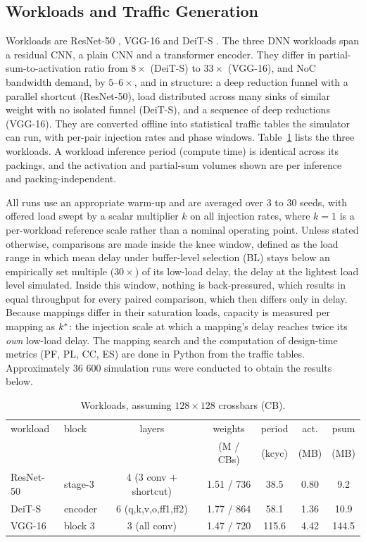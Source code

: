\subsection{Workloads and Traffic Generation}
\label{sec:workloads}
Workloads are ResNet-50 \cite{heDeepResidualLearning2016}, VGG-16 \cite{simonyanVeryDeepConvolutional2014} and DeiT-S \cite{touvronTrainingDataefficientImage2020}. The three DNN workloads span a residual CNN, a plain CNN and a transformer encoder. They differ in partial-sum-to-activation ratio from $8\times$ (DeiT-S) to $33\times$ (VGG-16), and NoC bandwidth demand, by $5$–$6\times$, and in structure: a deep reduction funnel with a parallel shortcut (ResNet-50), load distributed across many sinks of similar weight with no isolated funnel (DeiT-S), and a sequence of deep reductions (VGG-16). They are converted offline into statistical traffic tables the simulator can run, with per-pair injection rates and phase windows. Table~\ref{tab:workloads} lists the three workloads. A workload inference period (compute time) is identical across its packings, and the activation and partial-sum volumes shown are per inference and packing-independent. 

 All runs use an appropriate warm-up and are averaged over 3 to 30 seeds, with offered load swept by a scalar multiplier $k$ on all injection rates, where $k=1$ is a per-workload reference scale rather than a nominal operating point. Unless stated otherwise, comparisons are made inside the knee window, defined as the load range in which mean delay under buffer-level selection (BL) stays below an empirically set multiple ($30\times$) of its low-load delay, the delay at the lightest load level simulated. Inside this window, nothing is back-pressured, which results in equal
throughput for every paired comparison, which then differs only in delay. Because mappings differ in their saturation loads, capacity is measured per mapping as $k^{*}$: the injection scale at which a mapping's delay reaches twice its \emph{own} low-load delay. The mapping search and the computation of design-time metrics (PF, PL, CC, ES) are done in Python from the traffic tables. Approximately 36 600 simulation runs were conducted to obtain the results below.


 \begin{table}[t]
  \caption{Workloads, assuming $128{\times}128$ crossbars (CB).}
  \label{tab:workloads}
  \centering
  \footnotesize
  \setlength{\tabcolsep}{2pt}
  \begin{tabular}{@{}llccccc@{}}
    \toprule
    workload & block & layers & weights & period & act. & psum \\
     & & & (M / CBs) & (kcyc) & (MB) & (MB) \\
    \midrule
    ResNet-50 & stage-3 & 4 (3 conv + shortcut) & 1.51 / 736 & 38.5  & 0.80 & 9.2 \\
    DeiT-S    & encoder & 6 (q,k,v,o,ff1,ff2)   & 1.77 / 864 & 58.1  & 1.36 & 10.9 \\
    VGG-16    & block 3 & 3 (all conv)          & 1.47 / 720 & 115.6 & 4.42 & 144.5 \\
    \bottomrule
  \end{tabular}
\end{table}

